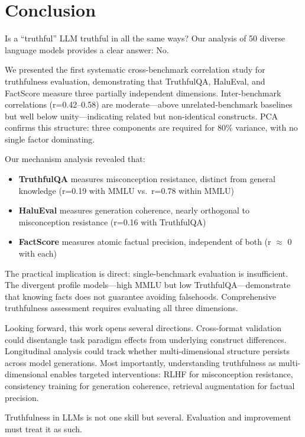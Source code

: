 \section{Conclusion}
\label{sec:conclusion}

Is a ``truthful'' LLM truthful in all the same ways? Our analysis of 50 diverse language models provides a clear answer: No.

We presented the first systematic cross-benchmark correlation study for truthfulness evaluation, demonstrating that TruthfulQA, HaluEval, and FactScore measure three partially independent dimensions. Inter-benchmark correlations (r=0.42--0.58) are moderate---above unrelated-benchmark baselines but well below unity---indicating related but non-identical constructs. PCA confirms this structure: three components are required for 80\% variance, with no single factor dominating.

Our mechanism analysis revealed that:
\begin{itemize}
\item \textbf{TruthfulQA} measures misconception resistance, distinct from general knowledge (r=0.19 with MMLU vs.\ r=0.78 within MMLU)
\item \textbf{HaluEval} measures generation coherence, nearly orthogonal to misconception resistance (r=0.16 with TruthfulQA)
\item \textbf{FactScore} measures atomic factual precision, independent of both (r $\approx$ 0 with each)
\end{itemize}

The practical implication is direct: single-benchmark evaluation is insufficient. The divergent profile models---high MMLU but low TruthfulQA---demonstrate that knowing facts does not guarantee avoiding falsehoods. Comprehensive truthfulness assessment requires evaluating all three dimensions.

Looking forward, this work opens several directions. Cross-format validation could disentangle task paradigm effects from underlying construct differences. Longitudinal analysis could track whether multi-dimensional structure persists across model generations. Most importantly, understanding truthfulness as multi-dimensional enables targeted interventions: RLHF for misconception resistance, consistency training for generation coherence, retrieval augmentation for factual precision.

Truthfulness in LLMs is not one skill but several. Evaluation and improvement must treat it as such.
